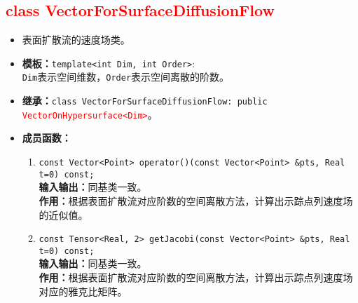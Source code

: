 \documentclass[a4paper,twoside]{ctexart}
\begin{document}
\textcolor{red}{
\section{class VectorForSurfaceDiffusionFlow}}
\begin{itemize}
    \item 表面扩散流的速度场类。
    \item \textbf{模板：}\texttt{template<int Dim, int Order>}:\\
    \texttt{Dim}表示空间维数，\texttt{Order}表示空间离散的阶数。
    \item \textbf{继承：}\texttt{class VectorForSurfaceDiffusionFlow: public \textcolor{red}{VectorOnHypersurface<Dim>}}。
    \item \textbf{成员函数：}
        \begin{enumerate}[(1)]
            \item \texttt{const Vector<Point> operator()(const Vector<Point> \&pts, Real t=0) const;}\\
            \textbf{输入输出：}同基类一致。\\
            \textbf{作用：}根据表面扩散流对应阶数的空间离散方法，计算出示踪点列速度场的近似值。
            \item \texttt{const Tensor<Real, 2> getJacobi(const Vector<Point> \&pts, Real t=0) const;}\\
            \textbf{输入输出：}同基类一致。\\
            \textbf{作用：}根据表面扩散流对应阶数的空间离散方法，计算出示踪点列速度场对应的雅克比矩阵。
        \end{enumerate}
\end{itemize}
\end{document}
